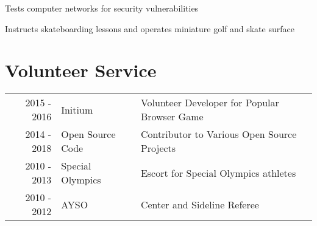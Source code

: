 \documentclass[]{resume}
\begin{document}
\begin{minipage}[t]{0.66\textwidth}
\sectionsep

\begin{tightemize}
\item Tests computer networks for security vulnerabilities
\item Instructs skateboarding lessons and operates miniature golf and skate surface
\end{tightemize}



\section{Volunteer Service}
\begin{tabular}{rll}
2015 - 2016 & Initium           & Volunteer Developer for Popular Browser Game \\
2014 - 2018 & Open Source Code  & Contributor to Various Open Source Projects \\
2010 - 2013 & Special Olympics  & Escort for Special Olympics athletes \\
2010 - 2012 & AYSO              & Center and Sideline Referee \\
\end{tabular}


\end{minipage}

%
%

\end{document}
